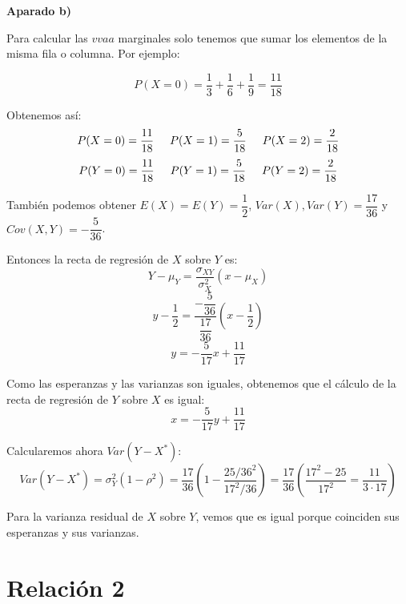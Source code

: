 \documentclass[openany]{book}
\begin{document}
\begin{exercise}
    $  $

    \begin{flushright}
        \textbf{Aparado b)}
    \end{flushright}

    Para calcular las $ vvaa $ marginales solo tenemos que sumar los elementos de la misma fila o columna. Por ejemplo:

    $$ P(X=0) = \dfrac{1}{3}+\dfrac{1}{6}+\dfrac{1}{9} = \dfrac{11}{18} $$

    Obtenemos así:
    $$ P(X=0) = \dfrac{11}{18} \hspace{5mm} P(X=1) = \dfrac{5}{18} \hspace{5mm} P(X=2) = \dfrac{2}{18}$$
    $$ P(Y=0) = \dfrac{11}{18} \hspace{5mm} P(Y=1) = \dfrac{5}{18} \hspace{5mm} P(Y=2) = \dfrac{2}{18} $$

    También podemos obtener $ E(X) = E(Y) = \dfrac{1}{2} $, $ Var(X),Var(Y) = \dfrac{17}{36} $ y $ Cov(X,Y) = -\dfrac{5}{36} $.

    Entonces la recta de regresión de $ X $ sobre $ Y $ es:
    $$ Y-\mu_{Y} = \dfrac{\sigma_{XY}}{\sigma_{X}^2}(x-\mu_{X}) $$
    $$ y-\dfrac{1}{2} = \dfrac{-\dfrac{5}{36}}{\dfrac{17}{36}} \left(x-\dfrac{1}{2}\right) $$
    $$ y = -\dfrac{5}{17}x+\dfrac{11}{17} $$
    
    Como las esperanzas y las varianzas son iguales, obtenemos que el cálculo de la recta de regresión de $ Y $ sobre $ X $ es igual:
    $$ x = -\dfrac{5}{17}y+\dfrac{11}{17} $$

    Calcularemos ahora $ Var(Y-X^*) $:
    $$ Var(Y-X^* ) = \sigma_{Y}^2 (1-\rho ^2) = \dfrac{17}{36} \left( 1-\dfrac{25/36^2}{17^2/36} \right) = \dfrac{17}{36} \left( \dfrac{17^2-25}{17^2} = \dfrac{11}{3\cdot 17} \right) $$

    Para la varianza residual de $ X $ sobre $ Y $, vemos que es igual porque coinciden sus esperanzas y sus varianzas.


\end{exercise}


\chapter{Relación 2}
\end{document}
